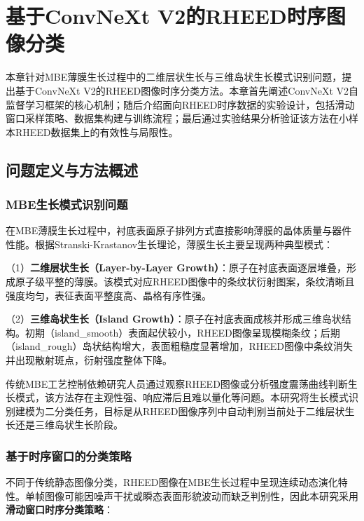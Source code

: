 \clearpage

\section{基于ConvNeXt V2的RHEED时序图像分类}

本章针对MBE薄膜生长过程中的二维层状生长与三维岛状生长模式识别问题，提出基于ConvNeXt V2的RHEED图像时序分类方法。本章首先阐述ConvNeXt V2自监督学习框架的核心机制；随后介绍面向RHEED时序数据的实验设计，包括滑动窗口采样策略、数据集构建与训练流程；最后通过实验结果分析验证该方法在小样本RHEED数据集上的有效性与局限性。

\subsection{问题定义与方法概述}

\subsubsection{MBE生长模式识别问题}

在MBE薄膜生长过程中，衬底表面原子排列方式直接影响薄膜的晶体质量与器件性能。根据Stranski-Krastanov生长理论，薄膜生长主要呈现两种典型模式：

（1）\textbf{二维层状生长（Layer-by-Layer Growth）}：原子在衬底表面逐层堆叠，形成原子级平整的薄膜。该模式对应RHEED图像中的条纹状衍射图案，条纹清晰且强度均匀，表征表面平整度高、晶格有序性强。

（2）\textbf{三维岛状生长（Island Growth）}：原子在衬底表面成核并形成三维岛状结构。初期（island\_smooth）表面起伏较小，RHEED图像呈现模糊条纹；后期（island\_rough）岛状结构增大，表面粗糙度显著增加，RHEED图像中条纹消失并出现散射斑点，衍射强度整体下降。

传统MBE工艺控制依赖研究人员通过观察RHEED图像或分析强度震荡曲线判断生长模式，该方法存在主观性强、响应滞后且难以量化等问题。本研究将生长模式识别建模为二分类任务，目标是从RHEED图像序列中自动判别当前处于二维层状生长还是三维岛状生长阶段。

\subsubsection{基于时序窗口的分类策略}

不同于传统静态图像分类，RHEED图像在MBE生长过程中呈现连续动态演化特性。单帧图像可能因噪声干扰或瞬态表面形貌波动而缺乏判别性，因此本研究采用\textbf{滑动窗口时序分类策略}：

